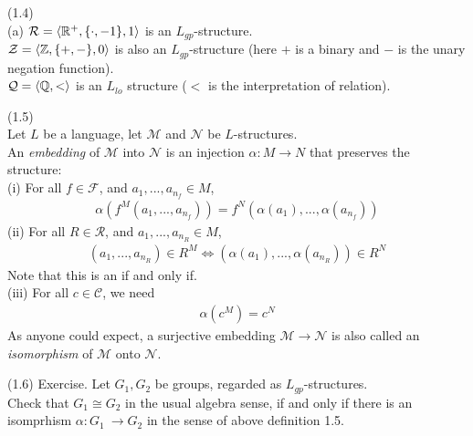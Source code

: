 \documentclass[a4paper]{article}
\begin{document}
\begin{eg} (1.4)\\
(a) $\mathcal{R} = \langle\mathbb{R}^+,\{\cdot,-1\},1\rangle$ is an $L_{gp}$-structure.\\
$\mathcal{Z} = \langle\mathbb{Z},\{+,-\},0\rangle$ is also an $L_{gp}$-structure (here $+$ is a binary and $-$ is the unary negation function).\\
$\mathcal{Q} = \langle\mathbb{Q},<\rangle$ is an $L_{lo}$ structure ($<$ is the interpretation of relation).
\end{eg}

\begin{defi} (1.5)\\
Let $L$ be a language, let $\mathcal{M}$ and $\mathcal{N}$ be $L$-structures.\\
An \emph{embedding} of $\mathcal{M}$ into $\mathcal{N}$ is an injection $\alpha:M \to N$ that preserves the structure:\\
(i) For all $f \in \mathcal{F}$, and $a_1,...,a_{n_f} \in M$,
\begin{equation*}
\begin{aligned}
\alpha(f^M(a_1,...,a_{n_f})) = f^N(\alpha(a_1),...,\alpha(a_{n_f}))
\end{aligned}
\end{equation*}
(ii) For all $R \in \mathcal{R}$, and $a_1,...,a_{n_R} \in M$,
\begin{equation*}
\begin{aligned}
(a_1,...,a_{n_R}) \in R^M \iff (\alpha(a_1),...,\alpha(a_{n_R})) \in R^N
\end{aligned}
\end{equation*}
Note that this is an if and only if.\\
(iii) For all $c \in \mathcal{C}$, we need 
\begin{equation*}
\begin{aligned}
\alpha(c^M) = c^N
\end{aligned}
\end{equation*}
As anyone could expect, a surjective embedding $\mathcal{M} \to \mathcal{N}$ is also called an \emph{isomorphism} of $\mathcal{M}$ onto $\mathcal{N}$.
\end{defi}

(1.6) Exercise. Let $G_1,G_2$ be groups, regarded as $L_{gp}$-structures.\\
Check that $G_1 \cong G_2$ in the usual algebra sense, if and only if there is an isomprhism $\alpha:G_1\ \to G_2$ in the sense of above definition 1.5.

\newpage
\end{document}

